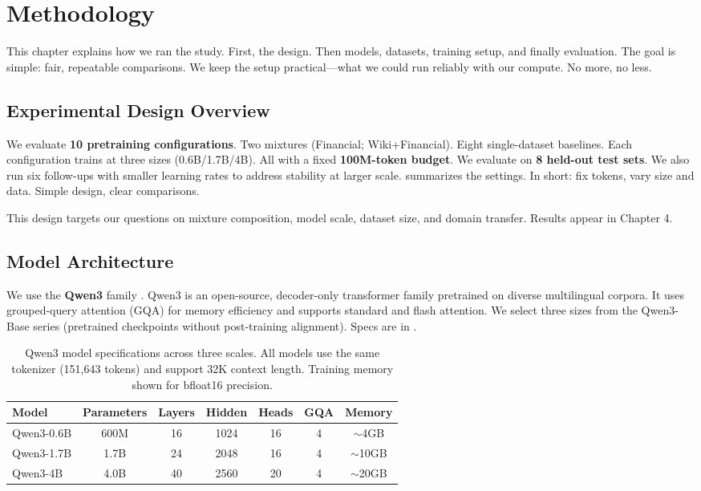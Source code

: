 \chapter{Methodology}

This chapter explains how we ran the study. First, the design. Then models, datasets, training setup, and finally evaluation. The goal is simple: fair, repeatable comparisons. We keep the setup practical—what we could run reliably with our compute. No more, no less.

\section{Experimental Design Overview}

We evaluate \textbf{10 pretraining configurations}. Two mixtures (Financial; Wiki+Financial). Eight single-dataset baselines. Each configuration trains at three sizes (0.6B/1.7B/4B). All with a fixed \textbf{100M-token budget}. We evaluate on \textbf{8 held-out test sets}. We also run six follow-ups with smaller learning rates to address stability at larger scale.  summarizes the settings. In short: fix tokens, vary size and data. Simple design, clear comparisons.



This design targets our questions on mixture composition, model scale, dataset size, and domain transfer. Results appear in Chapter 4.

\section{Model Architecture}

We use the \textbf{Qwen3} family \parencite{yang2024qwen2}. Qwen3 is an open-source, decoder-only transformer family pretrained on diverse multilingual corpora. It uses grouped-query attention (GQA) for memory efficiency and supports standard and flash attention. We select three sizes from the Qwen3-Base series (pretrained checkpoints without post-training alignment). Specs are in .

\begin{table}[h]
\centering
\caption[Qwen3 Model Specifications]{Qwen3 model specifications across three scales. All models use the same tokenizer (151,643 tokens) and support 32K context length. Training memory shown for bfloat16 precision.}
\label{tab:model_specs}
\begin{tabular}{lcccccc}
\toprule
\textbf{Model} & \textbf{Parameters} & \textbf{Layers} & \textbf{Hidden} & \textbf{Heads} & \textbf{GQA} & \textbf{Memory} \\
\midrule
Qwen3-0.6B & 600M & 16 & 1024 & 16 & 4 & $\sim$4GB \\
Qwen3-1.7B & 1.7B & 24 & 2048 & 16 & 4 & $\sim$10GB \\
Qwen3-4B & 4.0B & 40 & 2560 & 20 & 4 & $\sim$20GB \\
\bottomrule
\end{tabular}
\end{table}

